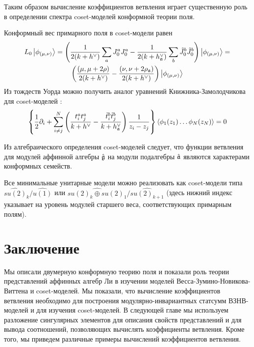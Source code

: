 Таким образом вычисление коэффициентов ветвления играет существенную роль в определении спектра coset-моделей конформной теории поля.

Конформный вес примарного поля в coset-модели равен
\begin{multline}
  L_0\left|\phi_{(\mu,\nu)}\right>=\left(\frac{1}{2(k+h^{\vee})}\sum_aJ^a_0J^a_0-\frac{1}{2(k+h_{\mathfrak{a}}^{\vee})}\sum_b \tilde{J}^b_0 \tilde{J}^b_0 \right)
  \left|\phi_{(\mu,\nu)}\right>=\\
  \left(\frac{(\mu,\mu+2\rho)}{2(k+h^{\vee})}-\frac{(\nu,\nu+2\rho_{\mathfrak{a}})}{2(k+h^{\vee})}\right)\left|\phi_{(\mu,\nu)}\right>
\end{multline}
Из тождеств Уорда можно получить аналог уравнений Книжника-Замолодчикова для coset-моделей \cite{kogan1997knizhnik}:
\begin{equation}
  \left\{\frac{1}{2}\partial_{i} + \sum_{i\neq j}^{N}\left(\frac{t^{a}_{i}t^{a}_{j}}{k+h^{\vee}}-\frac{\tilde t^{b}_{i}\tilde t^{b}_{j}}{k+h^{\vee}_{\mathfrak{a}}}\right)\frac{1}{z_{i}-z_{j}}\right\} \left<\phi_{1}(z_{1})\dots \phi_{N}(z_{N})\right>=0
  \label{eq:101}
\end{equation}

Из алгебраического определения coset-моделей следует, что функции ветвления для модулей аффинной алгебры $\hat{\mathfrak{g}}$ на модули подалгебры $\hat{\mathfrak{a}}$ являются характерами конформных семейств. 

Все минимальные унитарные модели можно реализовать как coset-модели типа $\widehat{su(2)}_k/\widehat{u(1)}$ или $\widehat{su(2)_k\oplus su(2)_1}/\widehat{su(2)_{k+1}}$ (здесь нижний индекс указывает на уровень модулей старшего веса, соответствующих примарным полям). 

\section{Заключение}
\label{sec:review-conclusion}

Мы описали двумерную конформную теорию поля и показали роль теории представлений аффинных алгебр Ли в изучении моделей Весса-Зумино-Новикова-Виттена и coset-моделей. Мы показали, что вычисление коэффициентов ветвления необходимо для построения модулярно-инвариантных статсумм ВЗНВ-моделей и для изучения coset-моделей. В следующей главе мы используем разложение сингулярных элементов для описания свойств представлений и для вывода соотношений, позволяющих вычислять коэффициенты ветвления. Кроме того, мы приведем различные примеры вычислений коэффициентов ветвления.
